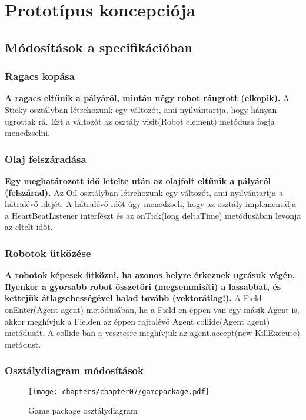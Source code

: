 %
\chapter{Prototípus koncepciója}

\thispagestyle{fancy}

\setcounter{section}{-1}
\section{Módosítások a specifikációban}

\subsection{Ragacs kopása}
\textbf{A ragacs eltűnik a pályáról, miután négy robot ráugrott (elkopik).}\newline
A Sticky osztályban létrehozunk egy változót, ami nyilvántartja, hogy hányan ugrottak rá. Ezt a változót az osztály visit(Robot element) metódusa fogja menedzselni.

\subsection{Olaj felszáradása}
\textbf{Egy meghatározott idő letelte után az olajfolt eltűnik a pályáról (felszárad).}\newline
Az Oil osztályban létrehozunk egy változót, ami nyilvántartja a hátralévő idejét. A hátralévő időt úgy menedzseli, hogy az osztály implementálja a HeartBeatListener interfészt és az onTick(long deltaTime) metódusában levonja az eltelt időt.

\subsection{Robotok ütközése}
\textbf{A robotok képesek ütközni, ha azonos helyre érkeznek ugrásuk végén. Ilyenkor a gyorsabb robot összetöri (megsemmisíti) a lassabbat, és kettejük átlagsebességével halad tovább (vektorátlag!).}\newline
A Field onEnter(Agent agent) metódusában, ha a Field-en éppen van egy másik Agent is, akkor meghívjuk a Fielden az éppen rajtalévő Agent collide(Agent agent) metódusát. A collide-ban a vesztesre meghívjuk az agent.accept(new KillExecute) metódust.

\clearpage

\subsection{Osztálydiagram módosítások}
\begin{figure}[h]
	\begin{center}
		\texttt{[image: chapters/chapter07/gamepackage.pdf]}
		\caption{Game package osztálydiagram}
		\label{Game package osztálydiagram}
	\end{center}
\end{figure}

